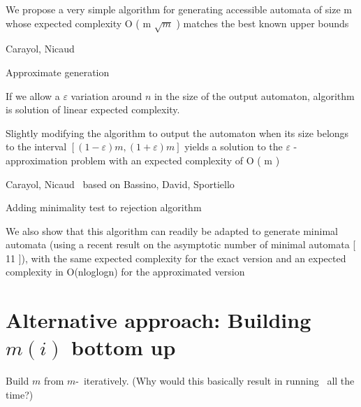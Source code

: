 We propose a very simple algorithm for generating accessible automata of size m whose
expected complexity O ( m $\sqrt{m}$ ) matches the best known upper bounds

Carayol, Nicaud~\cite[p. 9]{CN12}

Approximate generation

If we allow a $\varepsilon$ variation around $n$ in the size of the output automaton, algorithm is solution of linear expected complexity.

Slightly modifying the algorithm to output the automaton when its size belongs to the interval $[(1-\varepsilon ) m, (1+ \varepsilon ) m ]$ yields a solution to the $\varepsilon$ -approximation problem with an expected complexity of O ( m )

Carayol, Nicaud~\cite[p. 10]{CN12} based on Bassino, David, Sportiello~\cite{BDS11}

Adding minimality test to rejection algorithm

We also show that this algorithm can readily be adapted to generate
minimal automata (using a recent result on the asymptotic number of minimal automata
[ 11 ]), with the same expected complexity for the exact version and an expected complexity
in O(nloglogn) for the approximated version






\section{Alternative approach: Building $m(i)$ bottom up}

Build $m$ from $m$-\CompDist\ iteratively. (Why would this basically result in running \CompDist\ all the time?)






